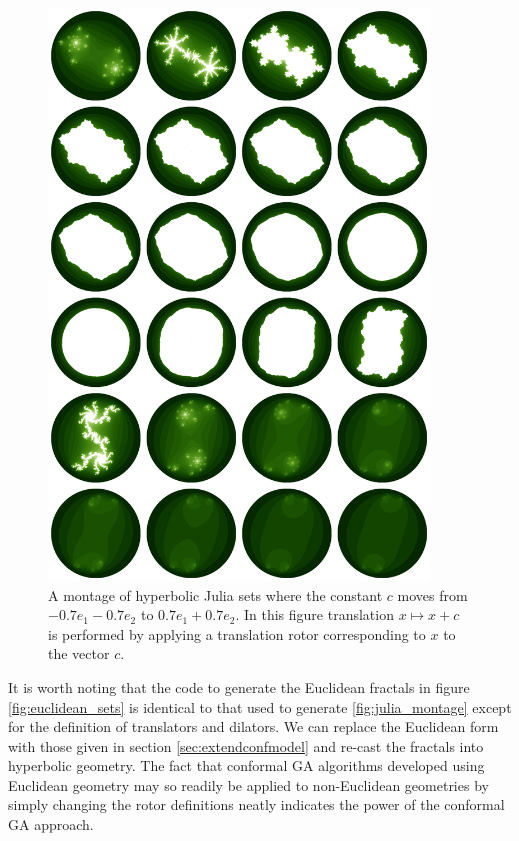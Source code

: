\begin{figure}[p]
\centering
\includegraphics[width=0.9\textwidth]{direct_julia_noneuclid}
\caption{\label{fig:direct_julia_noneuclid} 
  A montage of hyperbolic Julia sets where the constant $c$ moves from $-0.7e_1 - 0.7e_2$
  to $0.7e_1 + 0.7e_2$. 
  In this figure translation $x \mapsto x + c$ is performed by applying a
  translation rotor corresponding to $x$ to the vector $c$.
}
\end{figure}

It is worth noting that the code to generate the Euclidean fractals in figure 
\ref{fig:euclidean_sets} is identical to that used to generate
\ref{fig:julia_montage} except for the definition of translators and dilators.
We can replace the Euclidean form with those given in section
\ref{sec:extendconfmodel} and re-cast the fractals into hyperbolic geometry.
The fact that conformal GA algorithms developed using Euclidean geometry may
so readily be applied to non-Euclidean geometries by simply changing the rotor
definitions neatly indicates the power of the conformal GA approach.



